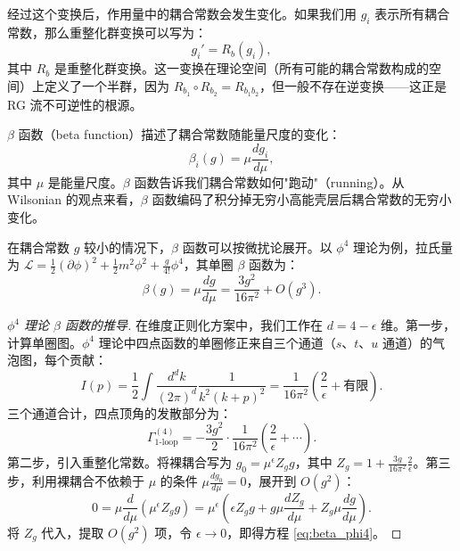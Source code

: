 经过这个变换后，作用量中的耦合常数会发生变化。如果我们用 $g_i$ 表示所有耦合常数，那么重整化群变换可以写为：
\begin{equation}
    g_i' = R_b(g_i),
\end{equation}
其中 $R_b$ 是重整化群变换。这一变换在理论空间（所有可能的耦合常数构成的空间）上定义了一个半群，因为 $R_{b_1} \circ R_{b_2} = R_{b_1 b_2}$，但一般不存在逆变换——这正是 RG 流不可逆性的根源。

\begin{definition}[$\beta$ 函数]\label{def:beta_function}
$\beta$ 函数（beta function）描述了耦合常数随能量尺度的变化：
\begin{equation}
    \beta_i(g) = \mu \frac{dg_i}{d\mu},
\end{equation}
其中 $\mu$ 是能量尺度。$\beta$ 函数告诉我们耦合常数如何"跑动"（running）。从 Wilsonian 的观点来看，$\beta$ 函数编码了积分掉无穷小高能壳层后耦合常数的无穷小变化。
\end{definition}

\begin{proposition}\label{prop:beta_perturbation}
在耦合常数 $g$ 较小的情况下，$\beta$ 函数可以按微扰论展开。以 $\phi^4$ 理论为例，拉氏量为 $\mathcal{L} = \frac{1}{2}(\partial\phi)^2 + \frac{1}{2}m^2\phi^2 + \frac{g}{4!}\phi^4$，其单圈 $\beta$ 函数为：
\begin{equation}\label{eq:beta_phi4}
    \beta(g) = \mu\frac{dg}{d\mu} = \frac{3g^2}{16\pi^2} + O(g^3).
\end{equation}
\end{proposition}

\begin{proof}[$\phi^4$ 理论 $\beta$ 函数的推导]
在维度正则化方案中，我们工作在 $d = 4 - \epsilon$ 维。第一步，计算单圈图。$\phi^4$ 理论中四点函数的单圈修正来自三个通道（$s$、$t$、$u$ 通道）的气泡图，每个贡献：
\begin{equation}
    I(p) = \frac{1}{2}\int \frac{d^dk}{(2\pi)^d} \frac{1}{k^2(k+p)^2} = \frac{1}{16\pi^2}\left(\frac{2}{\epsilon} + \text{有限}\right).
\end{equation}
三个通道合计，四点顶角的发散部分为：
\begin{equation}
    \Gamma^{(4)}_{\text{1-loop}} = -\frac{3g^2}{2} \cdot \frac{1}{16\pi^2}\left(\frac{2}{\epsilon} + \cdots\right).
\end{equation}
第二步，引入重整化常数。将裸耦合写为 $g_0 = \mu^{\epsilon} Z_g g$，其中 $Z_g = 1 + \frac{3g}{16\pi^2}\frac{2}{\epsilon}$。第三步，利用裸耦合不依赖于 $\mu$ 的条件 $\mu\frac{dg_0}{d\mu} = 0$，展开到 $O(g^2)$：
\begin{equation}
    0 = \mu\frac{d}{d\mu}\left(\mu^{\epsilon} Z_g g\right) = \mu^{\epsilon}\left(\epsilon Z_g g + g\mu\frac{dZ_g}{d\mu} + Z_g\mu\frac{dg}{d\mu}\right).
\end{equation}
将 $Z_g$ 代入，提取 $O(g^2)$ 项，令 $\epsilon \to 0$，即得方程 \eqref{eq:beta_phi4}。
\end{proof}

